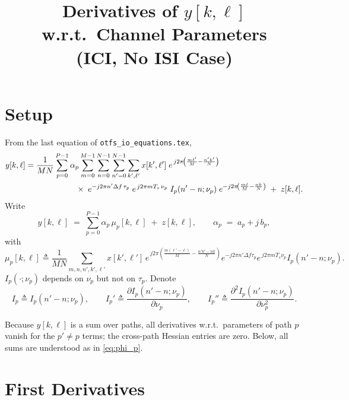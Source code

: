 \documentclass[11pt]{article}
\title{Derivatives of $y[k,\ell]$ w.r.t.\ Channel Parameters\\
       (ICI, No ISI Case)}
\date{}
\begin{document}
\maketitle

\section*{Setup}

From the last equation of \texttt{otfs\_io\_equations.tex},
\begin{align}
  y[k,\ell]
  &= \frac{1}{MN}
     \sum_{p=0}^{P-1}\alpha_p
     \sum_{m=0}^{M-1}\sum_{n=0}^{N-1}\sum_{n'=0}^{N-1}
     \sum_{k',\ell'}
     x[k',\ell']\;
     e^{\,j2\pi\!\left(\frac{m\ell'}{M}-\frac{n'k'}{N}\right)}
     \nonumber\\
  &\hspace{2.2cm}\times\;
     e^{-j2\pi n'\Delta f\,\tau_p}\;
     e^{\,j2\pi m T_s\,\nu_p}\;
     I_p(n'-n;\nu_p)\;
     e^{-j2\pi\!\left(\frac{m\ell}{M}-\frac{nk}{N}\right)}
     \;+\;z[k,\ell].
\end{align}
Write
\begin{equation}
  y[k,\ell] \;=\; \sum_{p=0}^{P-1}\alpha_p\,\mu_p[k,\ell]\;+\;z[k,\ell],
  \qquad
  \alpha_p \;=\; a_p + j\,b_p,
\end{equation}
with
\begin{equation}
  \mu_p[k,\ell]
  \triangleq
  \frac{1}{MN}
  \sum_{m,n,n',k',\ell'}
  x[k',\ell']\,
  e^{\,j2\pi\!\left(\frac{m(\ell'-\ell)}{M}-\frac{n'k'-nk}{N}\right)}
  e^{-j2\pi n'\Delta f\tau_p}
  e^{\,j2\pi m T_s\nu_p}
  I_p(n'-n;\nu_p).
  \label{eq:phi_p}
\end{equation}
$I_p(\cdot;\nu_p)$ depends on $\nu_p$ but not on $\tau_p$. 
Denote
\begin{equation}
  I_p \triangleq I_p(n'-n;\nu_p),\qquad
  I_p' \triangleq \frac{\partial I_p(n'-n;\nu_p)}{\partial \nu_p},\qquad
  I_p'' \triangleq \frac{\partial^2 I_p(n'-n;\nu_p)}{\partial \nu_p^2}.
\end{equation}

Because $y[k,\ell]$ is a sum over paths, all derivatives w.r.t.\ parameters
of path $p$ vanish for the $p'\neq p$ terms; the cross-path Hessian entries
are zero.  Below, all sums are understood as in \eqref{eq:phi_p}.

\section*{First Derivatives}
\end{document}
